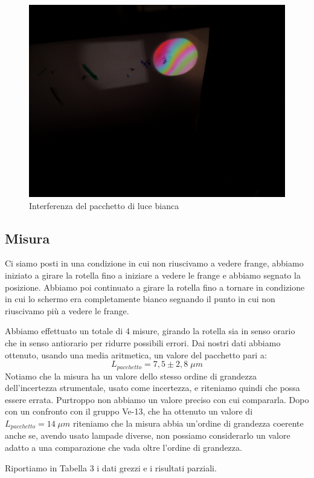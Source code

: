 \documentclass{article}
\begin{document}
\begin{figure}[h!]
  \centering
  \includegraphics[width=0.6\linewidth]{IM pacchetto}
  \caption{Interferenza del pacchetto di luce bianca}
\end{figure}


\subsection{Misura}
Ci siamo posti in una condizione in cui non riuscivamo a vedere frange, abbiamo iniziato a girare la rotella fino a iniziare a vedere le frange e abbiamo segnato la posizione. Abbiamo poi continuato a girare la rotella fino a tornare in condizione in cui lo schermo era completamente bianco segnando il punto in cui non riuscivamo più a vedere le frange.

\vspace{3mm}

Abbiamo effettuato un totale di 4 misure, girando la rotella sia in senso orario che in senso antiorario per ridurre possibili errori. Dai nostri dati abbiamo ottenuto, usando una media aritmetica, un valore del pacchetto pari a:
\[ L_{pacchetto} = 7,5 \pm 2,8 \; \mu m \]
Notiamo che la misura ha un valore dello stesso ordine di grandezza dell'incertezza strumentale, usato come incertezza, e riteniamo quindi che possa essere errata. Purtroppo non abbiamo un valore preciso con cui compararla. Dopo con un confronto con il gruppo Ve-13, che ha ottenuto un valore di $L_{pacchetto}=14 \; \mu m$ riteniamo che la misura abbia un'ordine di grandezza coerente anche se, avendo usato lampade diverse, non possiamo considerarlo un valore adatto a una comparazione che vada oltre l'ordine di grandezza.

\vspace{3mm}

Riportiamo in Tabella 3 i dati grezzi e i risultati parziali.
\end{document}
